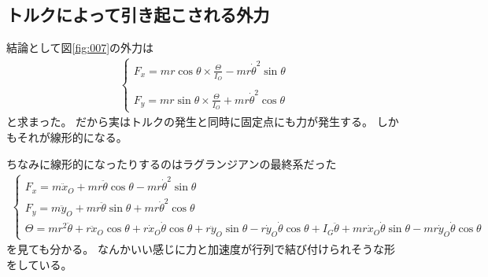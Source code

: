 \documentclass[a4paper,11pt]{jsarticle}
\begin{document}
\subsection{トルクによって引き起こされる外力}
結論として図\ref{fig:007}の外力は
\begin{align*}
  \begin{cases}
    \displaystyle F_x = mr\cos\theta\times\frac{\Theta}{I_O} - mr\dot{\theta}^2\sin\theta
    \\
    \\ \displaystyle F_y = mr\sin\theta\times\frac{\Theta}{I_O} + mr\dot{\theta}^2\cos\theta
  \end{cases}
\end{align*}
と求まった。
だから実はトルクの発生と同時に固定点にも力が発生する。
しかもそれが線形的になる。

ちなみに線形的になったりするのはラグランジアンの最終系だった
\begin{align*}
  \begin{cases}
    F_x = m\ddot{x}_O + mr\ddot{\theta}\cos\theta - mr\dot{\theta}^2\sin\theta
    \\ F_y = m\ddot{y}_O + mr\ddot{\theta}\sin\theta + mr\dot{\theta}^2\cos\theta
    \\ \Theta = mr^2\ddot{\theta} + r\ddot{x}_O\cos\theta 
    + r\dot{x}_O\dot{\theta}\cos\theta + r\ddot{y}_O\sin\theta - r\dot{y}_O\dot{\theta}\cos\theta + I_G\ddot{\theta}
    + mr\dot{x}_O\dot{\theta}\sin\theta - mr\dot{y}_O\dot{\theta}\cos\theta
  \end{cases}
\end{align*}
を見ても分かる。
なんかいい感じに力と加速度が行列で結び付けられそうな形をしている。



\end{document}
